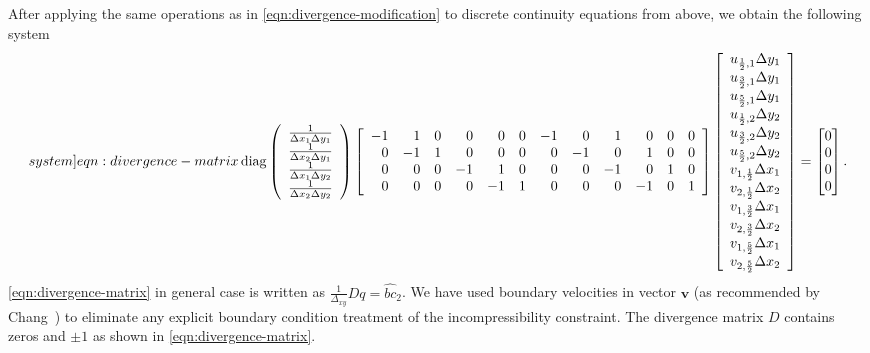 \documentclass{article}
\numberwithin{equation}{section}
\begin{document}
After applying the same operations as in \cref{eqn:divergence-modification} to discrete continuity equations from above, we obtain the following system
\begin{equation}\label[system]{eqn:divergence-matrix}
\operatorname{diag}\left(\begin{array}{cccc}
\frac{1}{\Delta x_1 \Delta y_1} \\
\frac{1}{\Delta x_2 \Delta y_1} \\
\frac{1}{\Delta x_1 \Delta y_2} \\
\frac{1}{\Delta x_2 \Delta y_2}
\end{array}\right)
\left[ \begin{array}{rrrrrrrrrrrr}
-1 & 1 & 0 & 0 & 0 & 0 & -1 & 0 & 1 & 0 & 0 & 0 \\
0 & -1 & 1 & 0 & 0 & 0 & 0 & -1 & 0 & 1 & 0 & 0 \\
0 & 0 & 0 & -1 & 1 & 0 & 0 & 0 & -1 & 0 & 1 & 0 \\
0 & 0 & 0 & 0 & -1 & 1 & 0 & 0 & 0 & -1 & 0 & 1
\end{array} \right]
\left[\begin{array}{l}
u_{\frac{1}{2},1} \Delta y_1 \\
u_{\frac{3}{2},1} \Delta y_1 \\
u_{\frac{5}{2},1} \Delta y_1 \\
u_{\frac{1}{2},2} \Delta y_2 \\
u_{\frac{3}{2},2} \Delta y_2 \\
u_{\frac{5}{2},2} \Delta y_2 \\
v_{1,\frac{1}{2}} \Delta x_1 \\
v_{2,\frac{1}{2}} \Delta x_2 \\
v_{1,\frac{3}{2}} \Delta x_1 \\
v_{2,\frac{3}{2}} \Delta x_2	 \\
v_{1,\frac{5}{2}} \Delta x_1 \\
v_{2,\frac{5}{2}} \Delta x_2 \\
\end{array}\right]=
\begin{bmatrix}{}
0 \\
0 \\
0 \\
0
\end{bmatrix}.
\end{equation}
\cref{eqn:divergence-matrix} in general case is written as $\frac{1}{\Delta_{xy}} D q=\hat{bc}_2$.
We have used boundary velocities in vector $\boldsymbol{v}$ (as recommended by Chang~\cite{Chang:2002}) to eliminate any explicit boundary condition treatment of the incompressibility constraint. The divergence matrix $D$ contains zeros and $\pm1$ as shown in \cref{eqn:divergence-matrix}.
\end{document}
